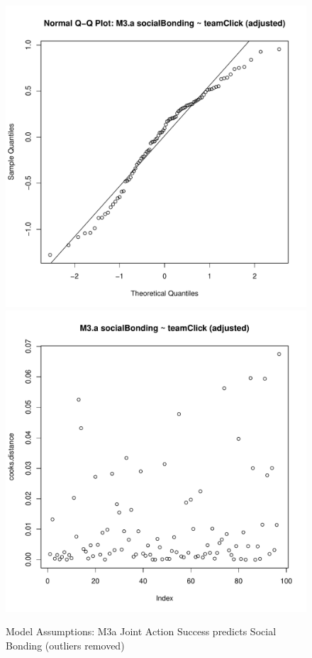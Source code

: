 \documentclass[12pt]{report}
\begin{document}
{\begin{figure}[htbp]
  \includegraphics[scale =.4]{../images/MLM3aOutQQNorm.pdf}
  \includegraphics[scale =.4]{../images/MLM3aOutCooksD.pdf}
  \caption{Model Assumptions: M3a Joint Action Success predicts Social Bonding (outliers removed)}
  \label{fig:MLM3aOutAssumptions}
\end{figure}

}
\end{document}

